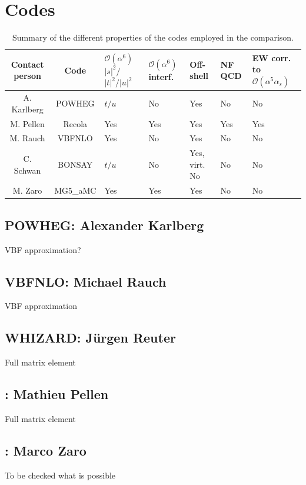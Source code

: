 \documentclass[a4paper,10pt]{report}
\begin{document}
\section{Codes}
\begin{table}
    \footnotesize
    \begin{tabularx}{\textwidth}{c|c|X|X|X|X|X}
        Contact person  &  Code  &  $\mathcal O(\alpha^6)$ $|s|^2/$ $|t|^2/|u|^2$  &  $\mathcal O(\alpha^6)$ interf.  &  Off-shell  &  NF QCD  &  EW corr. to $\mathcal O(\alpha^5\alpha_s)$  \\
        \hline
        \hline
        A. Karlberg  &  {\sc POWHEG}  &  $t/u$  &  No  &  Yes  &  No  &  No  \\
        M. Pellen    &  {\sc Recola}  &  Yes  &  Yes  &  Yes  &  Yes  &  Yes  \\
        M. Rauch     &  {\sc VBFNLO}  &  Yes  &  No  &  Yes  &  No  &  No  \\
        C. Schwan    &  {\sc BONSAY}  &  $t/u$  &  No  &  Yes, virt. No  &  No  &  No  \\
        M. Zaro      &  {\sc MG5\_aMC}  &  Yes  &  Yes  &  Yes  &  No  &  No
    \end{tabularx}
    \caption{\label{tab:codes} Summary of the different properties of the codes employed in the comparison.}
\end{table}

\subsection{ {\sc POWHEG}: Alexander Karlberg}
VBF approximation? \\
\subsection{ {\sc VBFNLO}: Michael Rauch}
VBF approximation \\
\subsection{ {\sc WHIZARD}: J\"urgen Reuter}
Full matrix element \\
\subsection{ \recola: Mathieu Pellen}
Full matrix element \\
\subsection{ \madgraph: Marco Zaro}
To be checked what is possible \\
\end{document}
